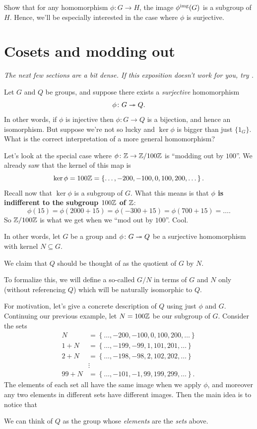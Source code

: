 \begin{ques}
	Show that for any homomorphism $\phi: G \to H$,
	the image $\phi^{\text{img}}(G)$ is a subgroup of $H$.
	Hence, we'll be especially interested in the case where $\phi$ is surjective.
\end{ques}

\section{Cosets and modding out}
\emph{The next few sections are a bit dense.
If this exposition doesn't work for you, try \cite{ref:gowers}.}

Let $G$ and $Q$ be groups, and suppose there exists
a \emph{surjective} homomorphism \[ \phi \colon G \twoheadrightarrow Q. \]
In other words, if $\phi$ is injective then $\phi \colon G \to Q$ is a bijection,
and hence an isomorphism.
But suppose we're not so lucky and $\ker\phi$ is bigger than just $\{1_G\}$.
What is the correct interpretation of a more general homomorphism?

Let's look at the special case where $\phi \colon \mathbb Z \to \mathbb Z/100\mathbb Z$ is ``modding out by $100$''.
We already saw that the kernel of this map is
\[
	\ker \phi = 100\mathbb Z = \left\{ \dots, -200, -100, 0, 100, 200, \dots  \right\}.
\]
Recall now that $\ker \phi$ is a subgroup of $G$.
What this means is that \textbf{$\phi$ is indifferent to the subgroup $100\mathbb Z$ of $\mathbb Z$}:
\[ \phi(15) = \phi(2000 + 15) = \phi(-300 + 15) = \phi(700 + 15) = \dots. \]
So $\mathbb Z/100\mathbb Z$ is what we get when we ``mod out by $100$''. Cool.

In other words, let $G$ be a group and $\phi \colon G \twoheadrightarrow Q$
be a surjective homomorphism with kernel $N \subseteq G$.
\begin{moral}
	We claim that $Q$ should be thought of as the quotient of $G$ by $N$.
\end{moral}
To formalize this, we will define a so-called
 $G/N$
in terms of $G$ and $N$ only (without referencing $Q$)
which will be naturally isomorphic to $Q$.

For motivation, let's give a concrete description of $Q$ using just $\phi$ and $G$.
Continuing our previous example, let $N = 100\mathbb Z$ be our subgroup of $G$.
Consider the sets
\begin{align*}
	N &= \left\{ \dots, -200, -100, 0, 100, 200, \dots \right\} \\
	1+N &= \left\{ \dots, -199, -99, 1, 101, 201, \dots \right\} \\
	2+N &= \left\{ \dots, -198, -98, 2, 102, 202, \dots \right\} \\
	&\vdots \\
	99+N &= \left\{ \dots, -101, -1, 99, 199, 299, \dots \right\}.
\end{align*}
The elements of each set all have the same image when we apply $\phi$,
and moreover any two elements in different sets have different images.
Then the main idea is to notice that
\begin{moral}
	We can think of $Q$ as the group
	whose \emph{elements} are the \emph{sets} above.
\end{moral}

